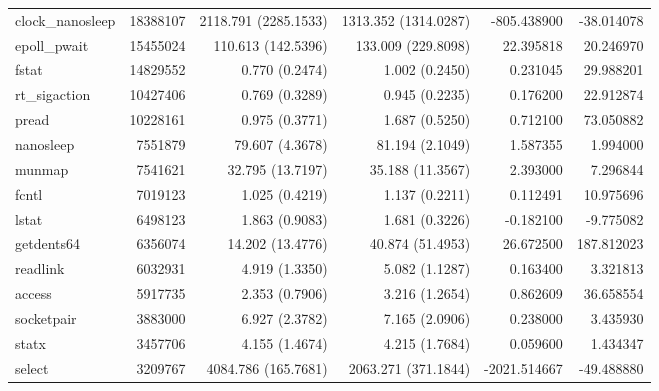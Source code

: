 \begin{longtable}{>{\ttfamily}lrrrrr}
               clock\_nanosleep &    18388107 &     2118.791 (2285.1533) &     1313.352 (1314.0287) &     -805.438900 &   -38.014078 \\
                   epoll\_pwait &    15455024 &       110.613 (142.5396) &       133.009 (229.8098) &       22.395818 &    20.246970 \\
                          fstat &    14829552 &           0.770 (0.2474) &           1.002 (0.2450) &        0.231045 &    29.988201 \\
                  rt\_sigaction &    10427406 &           0.769 (0.3289) &           0.945 (0.2235) &        0.176200 &    22.912874 \\
                          pread &    10228161 &           0.975 (0.3771) &           1.687 (0.5250) &        0.712100 &    73.050882 \\
                      nanosleep &     7551879 &          79.607 (4.3678) &          81.194 (2.1049) &        1.587355 &     1.994000 \\
                         munmap &     7541621 &         32.795 (13.7197) &         35.188 (11.3567) &        2.393000 &     7.296844 \\
                          fcntl &     7019123 &           1.025 (0.4219) &           1.137 (0.2211) &        0.112491 &    10.975696 \\
                          lstat &     6498123 &           1.863 (0.9083) &           1.681 (0.3226) &       -0.182100 &    -9.775082 \\
                     getdents64 &     6356074 &         14.202 (13.4776) &         40.874 (51.4953) &       26.672500 &   187.812023 \\
                       readlink &     6032931 &           4.919 (1.3350) &           5.082 (1.1287) &        0.163400 &     3.321813 \\
                         access &     5917735 &           2.353 (0.7906) &           3.216 (1.2654) &        0.862609 &    36.658554 \\
                     socketpair &     3883000 &           6.927 (2.3782) &           7.165 (2.0906) &        0.238000 &     3.435930 \\
                          statx &     3457706 &           4.155 (1.4674) &           4.215 (1.7684) &        0.059600 &     1.434347 \\
                         select &     3209767 &      4084.786 (165.7681) &      2063.271 (371.1844) &    -2021.514667 &   -49.488880 \\

\end{longtable}
